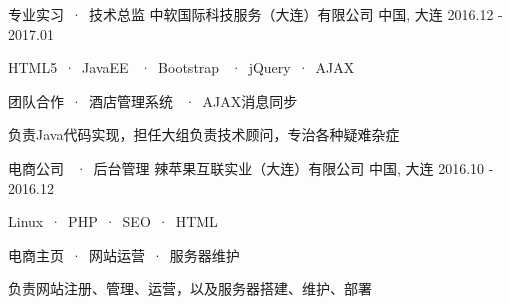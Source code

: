 

\begin{cventries}

  \cventrywork
    {专业实习\ ·\ 技术总监} %
    {中软国际科技服务（大连）有限公司} %
    {中国, 大连} %
    {2016.12 - 2017.01} %
    {
      \begin{cvitems} %
        \item {HTML5\ ·\ JavaEE \ ·\ Bootstrap \ ·\ jQuery\ ·\ AJAX}
        \item {团队合作\ ·\ 酒店管理系统 \ ·\ AJAX消息同步}
        \item {负责Java代码实现，担任大组负责技术顾问，专治各种疑难杂症}
      \end{cvitems}
    }
    
  \cventrywork
    {电商公司 \ ·\ 后台管理} %
    {辣苹果互联实业（大连）有限公司} %
    {中国, 大连} %
    {2016.10 - 2016.12} %
    {
      \begin{cvitems} %
        \item {Linux\ ·\ PHP\ ·\ SEO\ ·\ HTML}
        \item {电商主页\ ·\ 网站运营\ ·\ 服务器维护}
        \item {负责网站注册、管理、运营，以及服务器搭建、维护、部署}
      \end{cvitems}
    }
    
\end{cventries}